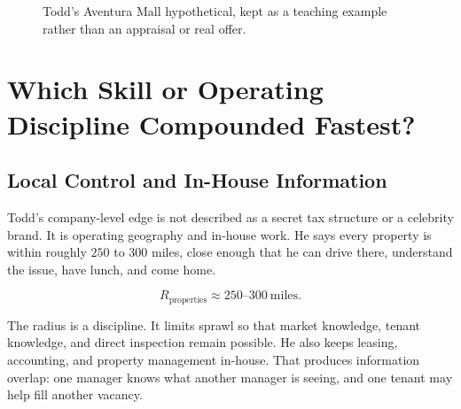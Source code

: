 \documentclass[11pt,oneside]{book}
\begin{document}
\begin{figure}
\centering
{}
\caption{Todd's Aventura Mall hypothetical, kept as a teaching example rather than an appraisal or real offer.}
\end{figure}

\chapter{Which Skill or Operating Discipline Compounded Fastest?}

\section{Local Control and In-House Information}

Todd's company-level edge is not described as a secret tax structure or a celebrity brand. It is operating geography and in-house work. He says every property is within roughly \(250\) to \(300\) miles, close enough that he can drive there, understand the issue, have lunch, and come home.

\begin{equation}
R_{\mathrm{properties}}\approx 250\text{--}300\ \mathrm{miles}.
\end{equation}

The radius is a discipline. It limits sprawl so that market knowledge, tenant knowledge, and direct inspection remain possible. He also keeps leasing, accounting, and property management in-house. That produces information overlap: one manager knows what another manager is seeing, and one tenant may help fill another vacancy.
\end{document}
